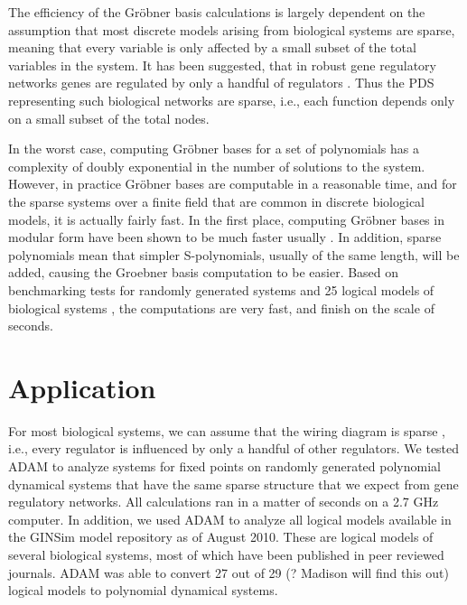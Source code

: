 \documentclass[11pt]{amsart}
\begin{document}
The efficiency of the Gr\"obner basis calculations is largely dependent on the
assumption that most discrete models arising from biological systems are
sparse, meaning that every variable is only affected by a small subset of the
total variables in the system.  It has been suggested, that in robust gene
regulatory networks genes are regulated by only a handful of regulators
\cite{Leclerc:2008}.  Thus the PDS representing such biological networks are
sparse, i.e., each function depends only on a small subset of the total nodes.

In the worst case, computing Gr\"obner bases for a set of polynomials has a
complexity of doubly exponential in the number of solutions to the system.
However, in practice Gr\"{o}bner bases are computable in a reasonable time, and
for the sparse systems over a finite field that are common in discrete
biological models, it is actually fairly fast. In the first place, computing
Gr\"{o}bner bases in modular form have been shown to be much faster usually
\cite{Brown:1971}. In addition, sparse polynomials mean that simpler
S-polynomials, usually of the same length, will be added, causing the Groebner
basis computation to be easier.
Based on benchmarking tests
for randomly generated systems and 25 logical models of biological systems
\cite{GINsim}, the computations are very fast, and finish on the scale of
seconds.

\section{Application} \label{benchmarks}%
For most biological systems, we can assume that the wiring diagram is sparse
\cite{Ting:1999},
i.e., every regulator is influenced by only a handful of other regulators. We
tested ADAM to analyze systems for fixed points on randomly generated
polynomial dynamical systems that have the same sparse structure that we
expect from gene regulatory networks. All calculations ran in a matter of seconds on
a 2.7 GHz computer. In addition, we used ADAM to analyze all logical models
available in the GINSim model repository \cite{GINsim} as of August 2010. These are logical
models of several biological systems, most of which have been published in
peer reviewed journals. ADAM was able to convert 27 out of 29 (? Madison will
find this out) logical
models to polynomial dynamical systems.
\end{document}
